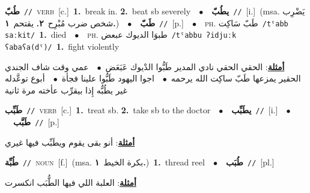 \documentclass[10pt,a4paper,twoside]{article} %
\begin{document}
\begin{multicols}{2}
{{{\setlength\topsep{0pt}\textbf{\foreignlanguage{arabic}{طُبّ}}\ {\color{gray}\texttt{//}\color{black}}\ \textsc{verb}\ [c.]\ \textbf{1.}~break in.  \textbf{2.}~beat sb severely\ \ $\bullet$\ \ \setlength\topsep{0pt}\textbf{\foreignlanguage{arabic}{يطُبّ}}\ {\color{gray}\texttt{//}\color{black}}\ [i.]\ \color{gray}(msa. \foreignlanguage{arabic}{يَضْرِب شخص ضرب مُبْرِح}~\foreignlanguage{arabic}{\textbf{٢.}}  \foreignlanguage{arabic}{يقتحم}~\foreignlanguage{arabic}{\textbf{١.}})\color{black}\ \ $\bullet$\ \ \setlength\topsep{0pt}\textbf{\foreignlanguage{arabic}{طَبّ}}\ {\color{gray}\texttt{//}\color{black}}\ [p.]\ \ $\bullet$\ \ \textsc{ph.} \color{gray} \foreignlanguage{arabic}{طَبّ سَاكِت}\color{black}\ {\color{gray}\texttt{/{\sffamily tˤabb saːkit}/}\color{black}}\ \textbf{1.}~died\ \ $\bullet$\ \ \textsc{ph.} \color{gray} \foreignlanguage{arabic}{طبوَا الديوك عبعض}\color{black}\ {\color{gray}\texttt{/{\sffamily tˤabbu ʔidjuːk ʕabaʕa(dˤ)}/}\color{black}}\ \textbf{1.}~fight violently\  \begin{flushright}\color{gray}\foreignlanguage{arabic}{\textbf{\underline{\foreignlanguage{arabic}{أمثلة}}}: الحقي الحقي نادي المدير طَبُّوا الدْيوك عَبَعَض\ $\bullet$\ \  عمي وقت شاف الجندي الحقير يمزعها طَبّ ساكِت الله يرحمه\ $\bullet$\ \  اجوا اليهود طَبُّوا علينا فجأة\ $\bullet$\ \  أبوع توعَّدله غير يطُبُّه إِذا بيقرِّب عأخته مرة ثانية}\end{flushright}\color{black}} \vspace{2mm}

{\setlength\topsep{0pt}\textbf{\foreignlanguage{arabic}{طَبِّب}}\ {\color{gray}\texttt{//}\color{black}}\ \textsc{verb}\ [c.]\ \textbf{1.}~treat sb.  \textbf{2.}~take sb to the doctor\ \ $\bullet$\ \ \setlength\topsep{0pt}\textbf{\foreignlanguage{arabic}{يطَبِّب}}\ {\color{gray}\texttt{//}\color{black}}\ [i.]\ \ $\bullet$\ \ \setlength\topsep{0pt}\textbf{\foreignlanguage{arabic}{طَبَّب}}\ {\color{gray}\texttt{//}\color{black}}\ [p.]\  \begin{flushright}\color{gray}\foreignlanguage{arabic}{\textbf{\underline{\foreignlanguage{arabic}{أمثلة}}}: أنو بقى يقوم ويطَبِّب فيها غيري}\end{flushright}\color{black}} \vspace{2mm}

{\setlength\topsep{0pt}\textbf{\foreignlanguage{arabic}{طُبِّة}}\ {\color{gray}\texttt{//}\color{black}}\ \textsc{noun}\ [f.]\ \color{gray}(msa. \foreignlanguage{arabic}{بكرة الخيط}~\foreignlanguage{arabic}{\textbf{١.}})\color{black}\ \textbf{1.}~thread reel\ \ $\bullet$\ \ \setlength\topsep{0pt}\textbf{\foreignlanguage{arabic}{طُبَب}}\ {\color{gray}\texttt{//}\color{black}}\ [pl.]\  \begin{flushright}\color{gray}\foreignlanguage{arabic}{\textbf{\underline{\foreignlanguage{arabic}{أمثلة}}}: العلبة اللي فيها الطُّبَب انكسرت}\end{flushright}\color{black}} \vspace{2mm}

}}
\end{multicols}
\end{document}
